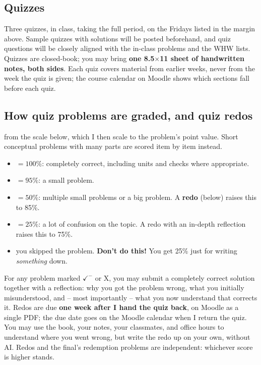\documentclass{tufte-handout}
\begin{document}
\subsection{Quizzes}

Three quizzes, in class, taking the full period, on the Fridays listed
in the margin above. Sample quizzes with solutions will be posted
beforehand, and quiz questions will be closely aligned with the
in-class problems and the WHW lists. Quizzes are closed-book; you may
bring \textbf{one 8.5$\times$11 sheet of handwritten notes, both
sides}. Each
quiz covers material from earlier weeks, never from the week the quiz
is given; the course calendar on Moodle shows which sections fall
before each quiz.

\subsection{How quiz problems are graded, and quiz redos}

 from the scale below, which
I then scale to the problem's point value. Short conceptual problems with
many parts are scored item by item instead.
\begin{itemize}
  \item[$\checkmark^{+}$] $= 100\%$: completely correct, including units
    and checks where appropriate.
  \item[$\checkmark$] $= 95\%$: a small problem.
  \item[$\checkmark^{-}$] $= 50\%$: multiple small problems or a big
    problem. A \textbf{redo} (below) raises this to 85\%.
  \item[X] $= 25\%$: a lot of confusion on the topic. A redo with an
    in-depth reflection raises this to 75\%.
  \item[$0$:] you skipped the problem. \textbf{Don't do this!} You get
    25\% just for writing \emph{something} down.
\end{itemize}

 For any problem marked $\checkmark^{-}$ or X, you may
submit a completely correct solution together with a reflection: why you
got the problem wrong, what you initially misunderstood, and -- most
importantly -- what you now understand that corrects it. Redos are due \textbf{one week after I hand the quiz
back}, on Moodle as a single PDF; the due date goes on the Moodle calendar
when I return the quiz. You may use the book, your notes, your classmates,
and office hours to understand where you went wrong, but write the redo
up on your own, without AI. Redos and the final's redemption problems are
independent: whichever score is higher stands.
\end{document}
